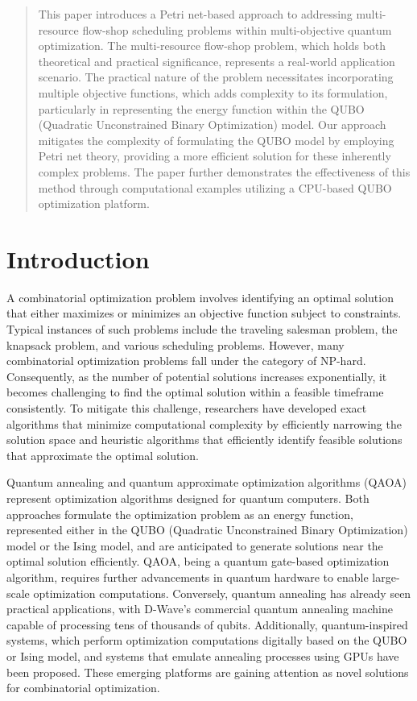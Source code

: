 \documentclass[conference]{IEEEtran}
\begin{document}
\maketitle

\begin{abstract}
This paper introduces a Petri net-based approach to addressing multi-resource flow-shop scheduling problems within multi-objective quantum optimization. The multi-resource flow-shop problem, which holds both theoretical and practical significance, represents a real-world application scenario. The practical nature of the problem necessitates incorporating multiple objective functions, which adds complexity to its formulation, particularly in representing the energy function within the QUBO (Quadratic Unconstrained Binary Optimization) model.
Our approach mitigates the complexity of formulating the QUBO model by employing Petri net theory, providing a more efficient solution for these inherently complex problems. The paper further demonstrates the effectiveness of this method through computational examples utilizing a CPU-based QUBO optimization platform.
\end{abstract}

\section{Introduction}
A combinatorial optimization problem involves identifying an optimal solution that either maximizes or minimizes an objective function subject to constraints. Typical instances of such problems include the traveling salesman problem, the knapsack problem, and various scheduling problems. However, many combinatorial optimization problems fall under the category of NP-hard. Consequently, as the number of potential solutions increases exponentially, it becomes challenging to find the optimal solution within a feasible timeframe consistently. To mitigate this challenge, researchers have developed exact algorithms that minimize computational complexity by efficiently narrowing the solution space and heuristic algorithms that efficiently identify feasible solutions that approximate the optimal solution.

Quantum annealing and quantum approximate optimization algorithms (QAOA) represent optimization algorithms designed for quantum computers\cite{qaoa, quantum_annealing}. Both approaches formulate the optimization problem as an energy function, represented either in the QUBO (Quadratic Unconstrained Binary Optimization) model or the Ising model, and are anticipated to generate solutions near the optimal solution efficiently. QAOA, being a quantum gate-based optimization algorithm, requires further advancements in quantum hardware to enable large-scale optimization computations. Conversely, quantum annealing has already seen practical applications, with D-Wave's commercial quantum annealing machine capable of processing tens of thousands of qubits. Additionally, quantum-inspired systems, which perform optimization computations digitally based on the QUBO or Ising model, and systems that emulate annealing processes using GPUs have been proposed. These emerging platforms are gaining attention as novel solutions for combinatorial optimization.
\end{document}
